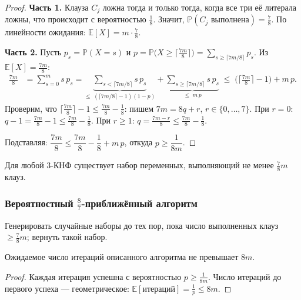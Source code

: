 \begin{proof}
	\textbf{Часть 1.}
	Клауза $C_j$ ложна тогда и только тогда, когда все три её литерала ложны, что происходит с вероятностью $\tfrac{1}{8}$. Значит, $\mathbb{P}(C_j \text{ выполнена}) = \tfrac{7}{8}$.
	По линейности ожидания: $\mathbb{E}[X] = m \cdot \tfrac{7}{8}$.
	
	\textbf{Часть 2.}
	Пусть $p_s = \mathbb{P}(X = s)$ и $p = \mathbb{P}\!\bigl(X \geq \lceil\tfrac{7m}{8}\rceil\bigr) = \sum_{s \geq \lceil 7m/8 \rceil} p_s$. Из $\mathbb{E}[X] = \tfrac{7m}{8}$:
	\begin{align*}
		\frac{7m}{8}
		&= \sum_{s=0}^{m} s\,p_s
		= \underbrace{\sum_{s < \lceil 7m/8 \rceil} s\,p_s}_{\leq\;(\lceil 7m/8 \rceil - 1)(1-p)}
		+ \underbrace{\sum_{s \geq \lceil 7m/8 \rceil} s\,p_s}_{\leq\; m\,p}
		\;\leq\; \bigl(\lceil\tfrac{7m}{8}\rceil - 1\bigr) + m\,p.
	\end{align*}
	Проверим, что $\lceil\tfrac{7m}{8}\rceil - 1 \leq \tfrac{7m}{8} - \tfrac{1}{8}$: пишем $7m = 8q + r$, $r \in \{0,\ldots,7\}$. При $r=0$: $q - 1 = \tfrac{7m}{8} - 1 \leq \tfrac{7m}{8} - \tfrac{1}{8}$. При $r \geq 1$: $q = \tfrac{7m-r}{8} \leq \tfrac{7m}{8} - \tfrac{1}{8}$.
	
	Подставляя: $\dfrac{7m}{8} \leq \dfrac{7m}{8} - \dfrac{1}{8} + m\,p$, откуда $p \geq \dfrac{1}{8m}$.
\end{proof}

\begin{Corollary}{}{}
	Для любой 3-КНФ существует набор переменных, выполняющий не менее $\tfrac{7}{8}m$ клауз.
\end{Corollary}

\subsubsection*{Вероятностный $\frac{8}{7}$-приближённый алгоритм}

Генерировать случайные наборы до тех пор, пока число выполненных клауз $\geq \tfrac{7}{8}m$; вернуть такой набор.

\begin{Theorem}{}{}
	Ожидаемое число итераций описанного алгоритма не превышает $8m$.
\end{Theorem}

\begin{proof}
	Каждая итерация успешна с вероятностью $p \geq \tfrac{1}{8m}$. Число итераций до первого успеха --- геометрическое: $\mathbb{E}[\text{итераций}] = \tfrac{1}{p} \leq 8m$.
\end{proof}

